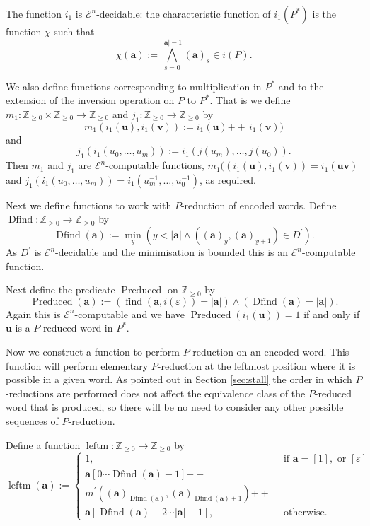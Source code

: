 \documentclass[a4paper]{article}
\newcommand{\grz}[1]{$\mathcal{E}^{#1}$}	%
\newcommand{\Zpos}{\mathbb{Z}_{\geq 0}}
\newcommand{\maps}{\longrightarrow}
\newcommand\eps{\varepsilon}
\newcommand{\avec}{\mathbf{a}}	%
\newcommand{\uvec}{\mathbf{u}}	%
\newcommand{\vvec}{\mathbf{v}}	%
\newcommand{\concat}{\ensuremath{+\!\!\!\!+\,}}	%
\newcommand{\find}{\operatorname{find}}
\newcommand{\Dfind}{\operatorname{Dfind}}
\newcommand{\Preduced}{\operatorname{Preduced}}
\newcommand{\leftm}{\operatorname{leftm}}
\theoremstyle{plain}
\theoremstyle{definition}
\begin{document}
The function $i_1$ is 
 \grz{n}-decidable: the characteristic function of $i_1(P^*)$ is the function 
$\chi$ such that 
\[\chi(\avec):=\displaystyle{\bigwedge_{s=0}^{|\avec|-1}}(\avec)_s \in i(P).\]  

We also define functions corresponding to multiplication in $P^*$  and to the extension of the inversion
operation on $P$ to $P^*$. That is we define $m_1:\Zpos\times\Zpos\maps \Zpos$ and $j_1:\Zpos\maps \Zpos$ by
\begin{equation}\label{eq:mmonoid}
m_1(i_1(\uvec),i_1(\vvec)):=i_1(\uvec)\concat i_1(\vvec)) 
\end{equation}
and 
\begin{equation}\label{eq:jmonoid}
j_1(i_1(u_0,\ldots, u_m)):=i_1(j(u_m),\ldots ,j(u_0)). 
\end{equation}
Then $m_1$ and $j_1$ are \grz{n}-computable functions, $m_1((i_1(\uvec),i_1(\vvec))=i_1(\uvec\vvec)$ 
and $j_1(i_1(u_0,\ldots, u_m))=i_1(u_m^{-1},\ldots , u_0^{-1})$, as required.

Next we define functions to work with $P$-reduction of encoded words.
Define $\Dfind:\Zpos\maps \Zpos$ by 
\begin{equation}\label{eq:Dfind}
\Dfind(\avec):=\min_y(y<|\avec|\wedge ((\avec)_y,(\avec)_{y+1})\in D^\prime).
\end{equation}
As $D^\prime$ is \grz{n}-decidable and the minimisation is bounded this is
an \grz{n}-computable function. 

Next define the predicate $\Preduced$ on $\Zpos$ by
\begin{equation}\label{eq:Preduced}
\Preduced(\avec):=\left(\find(\avec,i(\eps))=|\avec|\right)\wedge
\left( \Dfind(\avec)=|\avec|\right).
\end{equation} 
Again this is \grz{n}-computable and we have $\Preduced(i_1(\uvec))=1$ if and 
only if $\uvec$ is a $P$-reduced word in $P^\ast$. 

Now we construct a function to perform $P$-reduction on an encoded word. This
function will perform elementary $P$-reduction at the leftmost position where
it is possible in a given word. As pointed out in Section \ref{sec:stall} the
order in which $P$-reductions are performed does not affect the equivalence
class of the $P$-reduced word that is produced, so there will be no need to
consider any other possible  sequences of $P$-reduction. 

Define a function $\leftm:\Zpos\maps \Zpos$ by
\begin{equation}\label{eq:leftm}
\leftm(\avec):=
\left\{
\begin{array}{ll}
1,& \textrm{ if } \avec = [1], \textrm{ or } [\eps]\\
\avec[0\cdots \Dfind(\avec)-1]\concat &\\
m^\prime((\avec)_{\Dfind(\avec)},(\avec)_{\Dfind(\avec)+1})\concat&\\
\avec[\Dfind(\avec)+2\cdots |\avec|-1] ,& \textrm{ otherwise. } 
\end{array}
\right.
\end{equation}
\end{document}
